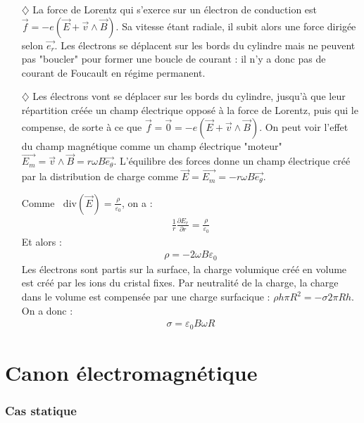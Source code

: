 \documentclass{report}
\newcommand*\diver{\mathop{}\!\mathrm{div}}
\begin{document}
\begin{itemize}

	\item[$\diamondsuit$] La force de Lorentz qui s'exerce sur un électron de conduction est $\vec{f}=-e(\vec{E}+\vec{v}\wedge\vec{B})$. Sa vitesse étant radiale, il subit alors une force dirigée selon $\vec{e_r}$. Les électrons se déplacent sur les bords du cylindre mais ne peuvent pas "boucler" pour former une boucle de courant : il n'y a donc pas de courant de Foucault en régime permanent.
	
	\item[$\diamondsuit$] Les électrons vont se déplacer sur les bords du cylindre, jusqu'à que leur répartition créée un champ électrique opposé à la force de Lorentz, puis qui le compense, de sorte à ce que $\vec{f}=\vec{0}=-e(\vec{E}+\vec{v}\wedge\vec{B})$. On peut voir l'effet du champ magnétique comme un champ électrique "moteur" $\vec{E_m}=\vec{v}\wedge\vec{B}=r\omega B\vec{e_\theta}$. L'équilibre des forces donne un champ électrique créé par la distribution de charge comme $\vec{E}=\vec{E_m}=-r\omega B\vec{e_\theta}$.
	
	Comme $\diver(\vec{E})=\frac{\rho}{\varepsilon_0}$, on a :
	\begin{align*}
		\frac{1}{r}\frac{\partial E_r}{\partial r} 	= \frac{\rho}{\varepsilon_0}
	\end{align*}
	Et alors :
	\begin{align*}
		\rho = -2\omega B\varepsilon_0
	\end{align*}
	Les électrons sont partis sur la surface, la charge volumique créé en volume est créé par les ions du cristal fixes. Par neutralité de la charge, la charge dans le volume est compensée par une charge surfacique : $\rho h\pi R^2=-\sigma 2\pi Rh$. On a donc :
	\begin{align*}
		\sigma = \varepsilon_0 B\omega R
	\end{align*}
 
\end{itemize}

\section*{Canon électromagnétique}

\subsubsection*{Cas statique}
\end{document}

